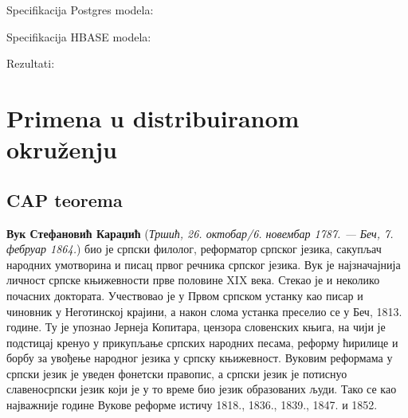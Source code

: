 \documentclass[12pt,oneside]{memoir}
\begin{document}
Specifikacija Postgres modela:

Specifikacija HBASE modela:

Rezultati:

\section{Primena u distribuiranom okruženju}
\subsection{CAP teorema}

\literatura

\backmatter

\begin{biografija}
\textbf{Вук Стефановић Караџић} (\emph{Тршић, 26. октобар/6. новембар
  1787. — Беч, 7. фебруар 1864.}) био је српски филолог, реформатор
српског језика, сакупљач народних умотворина и писац првог речника
српског језика.  Вук је најзначајнија личност српске књижевности прве
половине XIX века. Стекао је и неколико почасних доктората.
Учествовао је у Првом српском устанку као писар и чиновник у
Неготинској крајини, а након слома устанка преселио се у Беч,
1813. године. Ту је упознао Јернеја Копитара, цензора словенских
књига, на чији је подстицај кренуо у прикупљање српских народних
песама, реформу ћирилице и борбу за увођење народног језика у српску
књижевност. Вуковим реформама у српски језик је уведен фонетски
правопис, а српски језик је потиснуо славеносрпски језик који је у то
време био језик образованих људи. Тако се као најважније године Вукове
реформе истичу 1818., 1836., 1839., 1847. и 1852.
\end{biografija}
\end{document}
